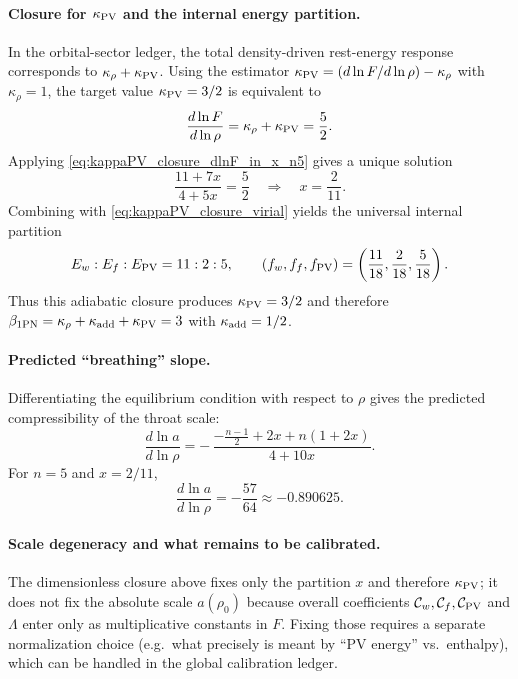 \documentclass[11pt]{article}
\begin{document}
\paragraph{Closure for \texorpdfstring{$\kappa_{\rm PV}$}{kappaPV} and the internal energy partition.}
In the orbital-sector ledger, the total density-driven rest-energy response corresponds to
\(\kappa_\rho+\kappa_{\rm PV}\). Using the estimator
\(\kappa_{\rm PV} = (d\ln F/d\ln\rho)-\kappa_\rho\) with \(\kappa_\rho=1\), the target value
\(\kappa_{\rm PV}=3/2\) is equivalent to
\begin{equation}
\frac{d\ln F}{d\ln\rho} = \kappa_\rho+\kappa_{\rm PV} = \frac{5}{2}.
\label{eq:kappaPV_closure_target_slope}
\end{equation}
Applying \eqref{eq:kappaPV_closure_dlnF_in_x_n5} gives a unique solution
\begin{equation}
\frac{11+7x}{4+5x}=\frac{5}{2}
\quad\Rightarrow\quad
x=\frac{2}{11}.
\label{eq:kappaPV_closure_x_solution}
\end{equation}
Combining with \eqref{eq:kappaPV_closure_virial} yields the universal internal partition
\begin{equation}
E_w:E_f:E_{\rm PV} = 11:2:5,
\qquad
(f_w,f_f,f_{\rm PV})=\left(\frac{11}{18},\frac{2}{18},\frac{5}{18}\right).
\label{eq:kappaPV_closure_partition}
\end{equation}
Thus this adiabatic closure produces \(\kappa_{\rm PV}=3/2\) and therefore
\(\beta_{\rm 1PN}=\kappa_\rho+\kappa_{\rm add}+\kappa_{\rm PV}=3\) with \(\kappa_{\rm add}=1/2\).

\paragraph{Predicted ``breathing'' slope.}
Differentiating the equilibrium condition with respect to \(\rho\) gives the predicted compressibility of the
throat scale:
\begin{equation}
\frac{d\ln a}{d\ln\rho}
=
-\,\frac{-\frac{n-1}{2} + 2x + n(1+2x)}{4+10x}.
\label{eq:kappaPV_closure_dlnA_general_n}
\end{equation}
For \(n=5\) and \(x=2/11\),
\begin{equation}
\frac{d\ln a}{d\ln\rho} = -\frac{57}{64}\approx -0.890625.
\label{eq:kappaPV_closure_dlnA_n5}
\end{equation}

\paragraph{Scale degeneracy and what remains to be calibrated.}
The dimensionless closure above fixes only the partition \(x\) and therefore \(\kappa_{\rm PV}\); it does not
fix the absolute scale \(a(\rho_0)\) because overall coefficients \(\mathcal{C}_w,\mathcal{C}_f,\mathcal{C}_{\rm PV}\) and \(\Lambda\) enter
only as multiplicative constants in \(F\). Fixing those requires a separate normalization choice (e.g.\ what
precisely is meant by ``PV energy'' vs.\ enthalpy), which can be handled in the global calibration ledger.
\end{document}
